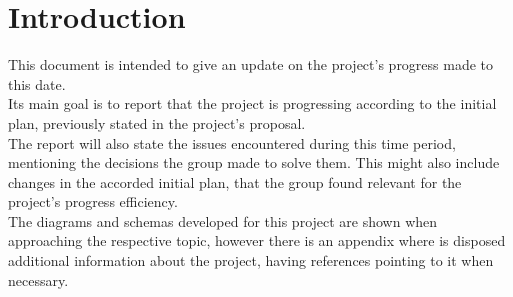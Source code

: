 %
%

\chapter{Introduction}

This document is intended to give an update on the project's progress made to this date.\\

Its main goal is to report that the project is progressing according to the initial plan, previously stated 
in the project's proposal.\\

The report will also state the issues encountered during this time period, mentioning the 
decisions the group made to solve them. This might also include changes in the accorded
initial plan, that the group found relevant for the project's progress efficiency.\\

The diagrams and schemas developed for this project are shown when approaching the respective topic,
however there is an appendix where is disposed additional information about the project, having 
references pointing to it when necessary.